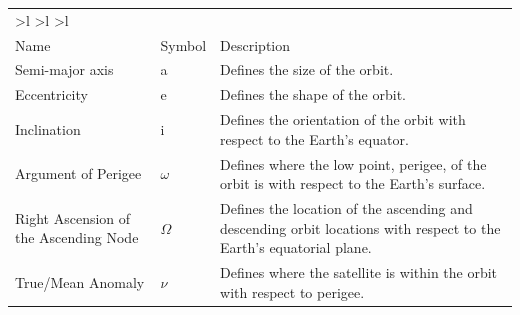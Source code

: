 \documentclass[12pt]{article}
\begin{document}
\begin{table}[]
\begin{tabular}{|p{3.75cm}|l|p{10.25cm}|}
		{
			>{\columncolor[HTML]{EEEEEE}}l 
			>{\columncolor[HTML]{EEEEEE}}l 
			>{\columncolor[HTML]{EEEEEE}}l }
		\multicolumn{3}{c}{\cellcolor[HTML]{6699CC}{\color[HTML]{FFFFFF} \textbf{Orbital Elements:}}}
		                                                                  \\
Name & Symbol & Description               \\ \hline
		Semi-major axis                       & a & Defines the size of the orbit.                                                                                     \\
		Eccentricity                          & e & Defines the shape of the orbit.                                                                                    \\
		Inclination                           & i & \multicolumn{1}{m{8cm}}{\cellcolor[HTML]{EEEEEE}Defines the orientation of the orbit with respect to the Earth's equator.}                              \\
		Argument of Perigee                   &$\omega$   & \multicolumn{1}{m{8cm}}{\cellcolor[HTML]{EEEEEE}Defines where the low point, perigee, of the orbit is with respect to the Earth's surface.}                         \\
		Right Ascension of the Ascending Node &$\Omega$   & \multicolumn{1}{m{8cm}}{\cellcolor[HTML]{EEEEEE}Defines the location of the ascending and descending orbit locations with respect to the Earth's equatorial plane.} \\
		True/Mean Anomaly                     & $\nu$  & \multicolumn{1}{m{8cm}}{\cellcolor[HTML]{EEEEEE}Defines where the satellite is within the orbit with respect to perigee.}     
		\fi                                     
	\end{tabular}
\end{table}


	
\iffalse
\end{document}

